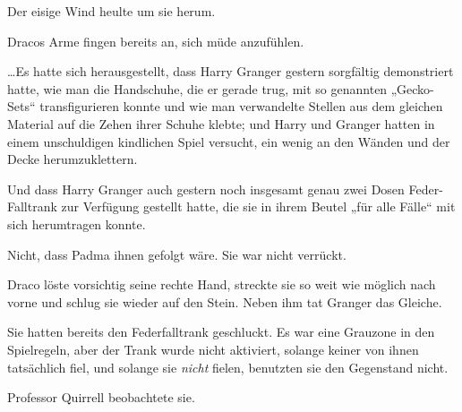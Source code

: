 \later

Der eisige Wind heulte um sie herum.

Dracos Arme fingen bereits an, sich müde anzufühlen.

…Es hatte sich herausgestellt, dass Harry Granger gestern sorgfältig demonstriert hatte, wie man die Handschuhe, die er gerade trug, mit so genannten „Gecko-Sets“ transfigurieren konnte und wie man verwandelte Stellen aus dem gleichen Material auf die Zehen ihrer Schuhe klebte; und Harry und Granger hatten in einem unschuldigen kindlichen Spiel versucht, ein wenig an den Wänden und der Decke herumzuklettern.

Und dass Harry Granger auch gestern noch insgesamt genau zwei Dosen Feder-Falltrank zur Verfügung gestellt hatte, die sie in ihrem Beutel „für alle Fälle“ mit sich herumtragen konnte.

Nicht, dass Padma ihnen gefolgt wäre. Sie war nicht verrückt.

Draco löste vorsichtig seine rechte Hand, streckte sie so weit wie möglich nach vorne und schlug sie wieder auf den Stein. Neben ihm tat Granger das Gleiche.

Sie hatten bereits den Federfalltrank geschluckt. Es war eine Grauzone in den Spielregeln, aber der Trank wurde nicht aktiviert, solange keiner von ihnen tatsächlich fiel, und solange sie \emph{nicht} fielen, benutzten sie den Gegenstand nicht.

Professor Quirrell beobachtete sie.

